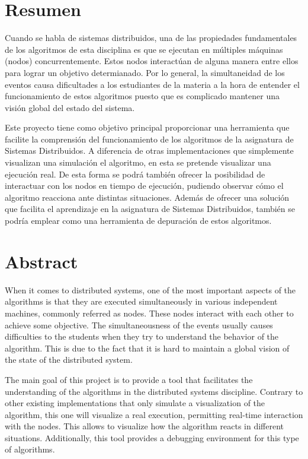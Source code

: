 \chapter*{Resumen}

Cuando se habla de sistemas distribuidos, una de las propiedades fundamentales de los algoritmos de esta disciplina es que se ejecutan en múltiples máquinas (nodos) concurrentemente. Estos nodos interactúan de alguna manera entre ellos para lograr un objetivo determianado. Por lo general, la simultaneidad de los eventos causa dificultades a los estudiantes de la materia a la hora de entender el funcionamiento de estos algoritmos puesto que es complicado mantener una visión global del estado del sistema.

Este proyecto tiene como objetivo principal proporcionar una herramienta que facilite la comprensión del funcionamiento de los algoritmos de la asignatura de Sistemas Distribuidos. A diferencia de otras implementaciones que simplemente visualizan una simulación el algoritmo, en esta se pretende visualizar una ejecución real. De esta forma se podrá también ofrecer la posibilidad de interactuar con los nodos en tiempo de ejecución, pudiendo observar cómo el algoritmo reacciona ante distintas situaciones. Además de ofrecer una solución que facilita el aprendizaje en la asignatura de Sistemas Distribuidos, también se podría emplear como una herramienta de depuración de estos algoritmos.

\newpage

\chapter*{Abstract}

When it comes to distributed systems, one of the most important aspects of the algorithms is that they are executed simultaneously in various independent machines, commonly referred as nodes. These nodes interact with each other to achieve some objective. The simultaneousness of the events usually causes difficulties to the students when they try to understand the behavior of the algorithm. This is due to the fact that it is hard to maintain a global vision of the state of the distributed system.

The main goal of this project is to provide a tool that facilitates the understanding of the algorithms in the distributed systems discipline. Contrary to other existing implementations that only simulate a visualization of the algorithm, this one will visualize a real execution, permitting real-time interaction with the nodes. This allows to visualize how the algorithm reacts in different situations. Additionally, this tool provides a debugging environment for this type of algorithms.


